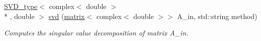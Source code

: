 \begin{DoxyCompactItemize}
\item 
\hypertarget{namespacekeycpp_a913fb7501259de640e7119a852adafc9}{\hyperlink{structkeycpp_1_1_s_v_d__type}{S\-V\-D\-\_\-type}$<$ complex$<$ double $>$\\*
, double $>$ \hyperlink{namespacekeycpp_a913fb7501259de640e7119a852adafc9}{svd} (\hyperlink{classkeycpp_1_1matrix}{matrix}$<$ complex$<$ double $>$$>$ A\-\_\-in, std\-::string method)}\label{namespacekeycpp_a913fb7501259de640e7119a852adafc9}

\begin{DoxyCompactList}\small\item\em Computes the singular value decomposition of matrix A\-\_\-in. \end{DoxyCompactList}\end{DoxyCompactItemize}



